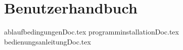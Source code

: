 
\part{Benutzerhandbuch}

{ablaufbedingungenDoc.tex}
{programminstallationDoc.tex}
\newpage
{bedienungsanleitungDoc.tex}
